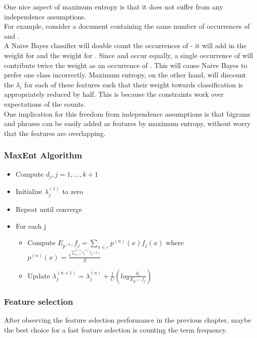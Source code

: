 One nice aspect of maximum entropy is that it does not suffer from any independence assumptions.\\
For example, consider a document containing the same number of occurrences of  and .\\
A Naive Bayes classifier will double count the occurrences of  
- it will add in the weight for  and the weight for . Since  and
 occur equally, a single occurrence of  will contribute twice the weight as an occurrence of . This will cause Naive Bayes to prefer one class 
incorrectly.
Maximum entropy, on the other hand, will discount the $\lambda_i$ for each of these features such that their weight towards classification is appropriately reduced by half.
This is because the constraints work over expectations of the counts. \\
One implication for this freedom from independence assumptions is that bigrams and phrases can be easily added as features by maximum entropy, without worry that the features are overlapping.


\subsubsection{MaxEnt Algorithm}


\begin{itemize}
\item Compute $d_j, j=1,...,k+1$
\item Initialize $\lambda_j^{(1)}$ to zero
\item Repeat until converge
\item For each j 
  \begin{itemize}
  \item Compute $E_{p^{(n)}} f_j = \sum\limits_{x \in \varepsilon} p^{(n)} (x)f_j(x)$
    where $p^{(n)}(x) = \frac{e^{\sum\limits_{j=1}^{k+1}\lambda_j^{(n)}f_j(x)}}{Z}$ 
  \item Update $\lambda_j^{(n+1)} = \lambda_j^{(n)} + \frac{1}{C}(log\frac{d_i}{E_{{p^{(n)}}}f_j})$
  \end{itemize}
\end{itemize}

  

\subsubsection{Feature selection}
After observing the feature selection performance in the previous chapter, maybe the best choice for a fast feature selection is counting the term frequency.






